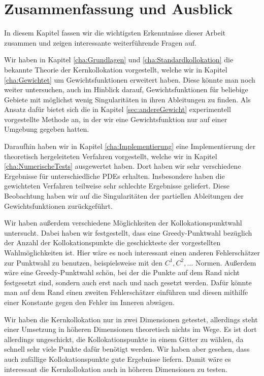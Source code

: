 \chapter{Zusammenfassung und Ausblick}
\label{cha:schluss}

In diesem Kapitel fassen wir die wichtigsten Erkenntnisse dieser Arbeit zusammen und zeigen interessante weiterführende Fragen auf.

Wir haben in Kapitel \ref{cha:Grundlagen} und \ref{cha:Standardkollokation} die bekannte Theorie der Kernkollokation vorgestellt, welche wir in Kapitel \ref{cha:Gewichtet} um Gewichtsfunktionen erweitert haben. Diese könnte man noch weiter untersuchen, auch im Hinblick darauf, Gewichtsfunktionen für beliebige Gebiete mit möglichst wenig Singularitäten in ihren Ableitungen zu finden. Als Ansatz dafür bietet sich die in Kapitel \ref{sec:andereGewicht} experimentell vorgestellte Methode an, in der wir eine Gewichtsfunktion nur auf einer Umgebung gegeben hatten.

Daraufhin haben wir in Kapitel \ref{cha:Implementierung} eine Implementierung der theoretisch hergeleiteten Verfahren vorgestellt, welche wir in Kapitel \ref{cha:NumerischeTests} ausgewertet haben. Dort haben wir sehr verschiedene Ergebnisse für unterschiedliche \acp{PDE} erhalten. Insbesondere haben die gewichteten Verfahren teilweise sehr schlechte Ergebnisse geliefert. Diese Beobachtung haben wir auf die Singularitäten der partiellen Ableitungen der Gewichtsfunktionen zurückgeführt.

Wir haben außerdem verschiedene Möglichkeiten der Kollokationspunktwahl untersucht. Dabei haben wir festgestellt, dass eine Greedy-Punktwahl bezüglich der Anzahl der Kollokationspunkte die geschickteste der vorgestellten Wahlmöglichkeiten ist. Hier wäre es noch interessant einen anderen Fehlerschätzer zur Punktwahl zu benutzen, beispielsweise mit den $C^1, C^2, \dots$ Normen. Außerdem wäre eine Greedy-Punktwahl schön, bei der die Punkte auf dem Rand nicht festgesetzt sind, sondern auch erst nach und nach gesetzt werden. Dafür könnte man auf dem Rand einen zweiten Fehlerschätzer einführen und diesen mithilfe einer Konstante gegen den Fehler im Inneren abwägen.

Wir haben die Kernkollokation nur in zwei Dimensionen getestet, allerdings steht einer Umsetzung in höheren Dimensionen theoretisch nichts im Wege. Es ist dort allerdings ungeschickt, die Kollokationspunkte in einem Gitter zu wählen, da schnell sehr viele Punkte dafür benötigt werden. Wir haben aber gesehen, dass auch zufällige Kollokationspunkte gute Ergebnisse liefern. Damit wäre es interessant die Kernkollokation auch in höheren Dimensionen zu testen.